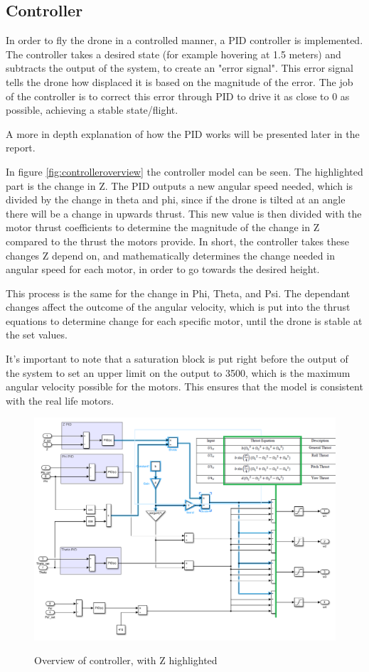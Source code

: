 \subsection{Controller}\label{linear}
In order to fly the drone in a controlled manner, a PID controller is implemented.
The controller takes a desired state (for example hovering at 1.5 meters) and subtracts the output of the system, to create an "error signal".
This error signal tells the drone how displaced it is based on the magnitude of the error. The job of the controller is to correct this error through PID to drive it as close to 0 as possible, achieving a stable state/flight.

A more in depth explanation of how the PID works will be presented later in the report. 

In figure \ref{fig:controlleroverview} the controller model can be seen. The highlighted part is the change in Z. The PID outputs a new angular speed needed, which is divided by the change in theta and phi, since if the drone is tilted at an angle there will be a change in upwards thrust. This new value is then divided with the motor thrust coefficients to determine the magnitude of the change in Z compared to the thrust the motors provide. In short, the controller takes these changes Z depend on, and mathematically determines the change needed in angular speed for each motor, in order to go towards the desired height. \cite{Ferry}

This process is the same for the change in Phi, Theta, and Psi. The dependant changes affect the outcome of the angular velocity, which is put into the thrust equations to determine change for each specific motor, until the drone is stable at the set values.

It's important to note that a saturation block is put right before the output of the system to set an upper limit on the output to 3500, which is the maximum angular velocity possible for the motors. This ensures that the model is consistent with the real life motors.

\begin{figure}[H]
\begin{center}
   \includegraphics[scale =0.6]{pictures/control/Controller.png}
   \label{controlleroverview}
\end{center}
\caption{Overview of controller, with Z highlighted}
\end{figure}